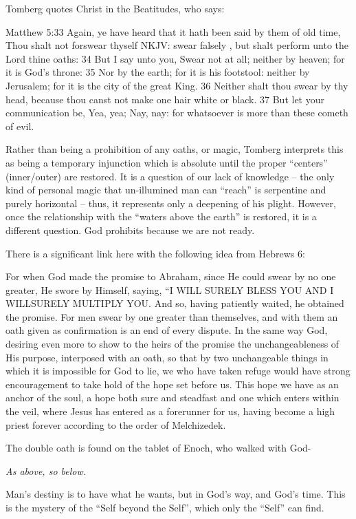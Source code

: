 Tomberg quotes Christ in the Beatitudes, who says:

\begin{quotex}
Matthew 5:33 Again, ye have heard that it hath been said by them of old time, Thou shalt not forswear thyself NKJV: swear falsely , but shalt perform unto the Lord thine oaths: 34 But I say unto you, Swear not at all; neither by heaven; for it is God's throne: 35 Nor by the earth; for it is his footstool: neither by Jerusalem; for it is the city of the great King. 36 Neither shalt thou swear by thy head, because thou canst not make one hair white or black. 37 But let your communication be, Yea, yea; Nay, nay: for whatsoever is more than these cometh of evil.
\end{quotex}

Rather than being a prohibition of any oaths, or magic, Tomberg interprets this as being a temporary injunction which is absolute until the proper ``centers'' (inner/outer) are restored. It is a question of our lack of knowledge -- the only kind of personal magic that un-illumined man can ``reach'' is serpentine and purely horizontal -- thus, it represents only a deepening of his plight. However, once the relationship with the ``waters above the earth'' is restored, it is a different question. God prohibits because we are not ready.

There is a significant link here with the following idea from Hebrews 6:

\begin{quotex}
For when God made the promise to Abraham, since He could swear by no one greater, He swore by Himself, saying, ``I WILL SURELY BLESS YOU AND I WILLSURELY MULTIPLY YOU. And so, having patiently waited, he obtained the promise. For men swear by one greater than themselves, and with them an oath given as confirmation is an end of every dispute. In the same way God, desiring even more to show to the heirs of the promise the unchangeableness of His purpose, interposed with an oath, so that by two unchangeable things in which it is impossible for God to lie, we who have taken refuge would have strong encouragement to take hold of the hope set before us. This hope we have as an anchor of the soul, a hope both sure and steadfast and one which enters within the veil, where Jesus has entered as a forerunner for us, having become a high priest forever according to the order of Melchizedek.
\end{quotex}


The double oath is found on the tablet of Enoch, who walked with God-

\emph{As above, so below.}


Man's destiny is to have what he wants, but in God's way, and God's time. This is the mystery of the ``Self beyond the Self'', which only the ``Self'' can find.



